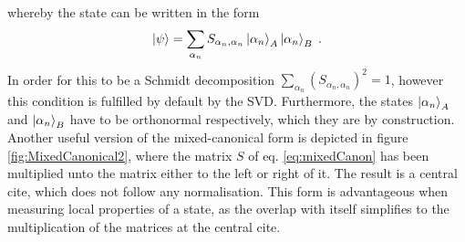 whereby the state can be written in the form
\begin{equation}
	\ket{\psi} = \sum_{\alpha_n} S_{\alpha_n , \alpha_n} \ket{\alpha_n}_A \ket{\alpha_n}_B \; .
\end{equation}
In order for this to be a Schmidt decomposition $\sum_{\alpha_n} (S_{\alpha_n , \alpha_n})^2 = 1$, however this condition is fulfilled by default by the SVD. Furthermore, the states $\ket{\alpha_n}_A$ and $\ket{\alpha_n}_B$ have to be orthonormal respectively, which they are by construction.\\
Another useful version of the mixed-canonical form is depicted in figure \ref{fig:MixedCanonical2}, where the matrix $S$ of eq. \eqref{eq:mixedCanon} has been multiplied unto the matrix either to the left or right of it. The result is a central cite, which does not follow any normalisation. This form is advantageous when measuring local properties of a state, as the overlap with itself simplifies to the multiplication of the matrices at the central cite.
 

